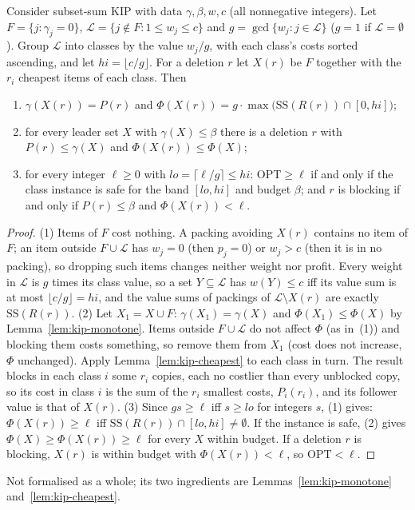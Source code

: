 \begin{proposition}\label{prop:kip-reduction}
Consider subset-sum KIP with data $\gamma,\beta,w,c$ (all nonnegative
integers). Let $F=\{j:\gamma_j=0\}$, $\mathcal{L}=\{j\notin F: 1\le w_j\le c\}$ and
$g=\gcd\{w_j: j\in\mathcal{L}\}$ ($g=1$ if $\mathcal{L}=\emptyset$). Group
$\mathcal{L}$ into classes by the value $w_j/g$, with each class's costs sorted
ascending, and let $hi=\lfloor c/g\rfloor$. For a deletion $r$ let $X(r)$ be $F$
together with the $r_i$ cheapest items of each class. Then
\begin{enumerate}
\item $\gamma(X(r))=P(r)$ and $\Phi(X(r))=g\cdot\max\bigl(\mathrm{SS}(R(r))\cap[0,hi]\bigr)$;
\item for every leader set $X$ with $\gamma(X)\le\beta$ there is a deletion $r$
with $P(r)\le\gamma(X)$ and $\Phi(X(r))\le\Phi(X)$;
\item for every integer $\ell\ge 0$ with $lo=\lceil\ell/g\rceil\le hi$:
$\mathrm{OPT}\ge\ell$ if and only if the class instance is safe for the band
$[lo,hi]$ and budget $\beta$; and $r$ is blocking if and only if
$P(r)\le\beta$ and $\Phi(X(r))<\ell$.
\end{enumerate}
\end{proposition}
\begin{proof}
(1) Items of $F$ cost nothing. A packing avoiding $X(r)$ contains no item of
$F$; an item outside $F\cup\mathcal{L}$ has $w_j=0$ (then $p_j=0$) or $w_j>c$ (then
it is in no packing), so dropping such items changes neither weight nor
profit. Every weight in $\mathcal{L}$ is $g$ times its class value, so a set
$Y\subseteq\mathcal{L}$ has $w(Y)\le c$ iff its value sum is at most
$\lfloor c/g\rfloor=hi$, and the value sums of packings of $\mathcal{L}\setminus X(r)$
are exactly $\mathrm{SS}(R(r))$.
(2) Let $X_1=X\cup F$: $\gamma(X_1)=\gamma(X)$ and $\Phi(X_1)\le\Phi(X)$ by
Lemma~\ref{lem:kip-monotone}. Items outside $F\cup\mathcal{L}$ do not affect $\Phi$
(as in~(1)) and blocking them costs something, so remove them from $X_1$
(cost does not increase, $\Phi$ unchanged). Apply Lemma~\ref{lem:kip-cheapest}
to each class in turn. The result blocks in each class $i$ some $r_i$ copies,
each no costlier than every unblocked copy, so its cost in class $i$ is the
sum of the $r_i$ smallest costs, $P_i(r_i)$, and its follower value is that
of $X(r)$.
(3) Since $g s\ge\ell$ iff $s\ge lo$ for integers $s$, (1) gives:
$\Phi(X(r))\ge\ell$ iff $\mathrm{SS}(R(r))\cap[lo,hi]\neq\emptyset$. If the instance is
safe, (2) gives $\Phi(X)\ge\Phi(X(r))\ge\ell$ for every $X$ within budget. If a
deletion $r$ is blocking, $X(r)$ is within budget with $\Phi(X(r))<\ell$, so
$\mathrm{OPT}<\ell$.
\end{proof}
\noindent Not formalised as a whole; its two ingredients are
Lemmas~\ref{lem:kip-monotone} and~\ref{lem:kip-cheapest}.

